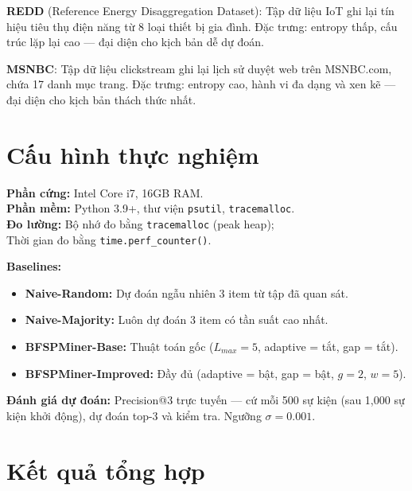 \documentclass[14pt,a4paper,oneside]{extreport}
\begin{document}
\textbf{REDD} (Reference Energy Disaggregation Dataset): Tập dữ liệu IoT ghi lại tín hiệu tiêu thụ điện năng từ 8 loại thiết bị gia đình. Đặc trưng: entropy thấp, cấu trúc lặp lại cao --- đại diện cho kịch bản dễ dự đoán.

\textbf{MSNBC}: Tập dữ liệu clickstream ghi lại lịch sử duyệt web trên MSNBC.com, chứa 17 danh mục trang. Đặc trưng: entropy cao, hành vi đa dạng và xen kẽ --- đại diện cho kịch bản thách thức nhất.

\section{Cấu hình thực nghiệm}

\textbf{Phần cứng:} Intel Core i7, 16GB RAM.\\
\textbf{Phần mềm:} Python 3.9+, thư viện \texttt{psutil}, \texttt{tracemalloc}.\\
\textbf{Đo lường:} Bộ nhớ đo bằng \texttt{tracemalloc} (peak heap);\\
Thời gian đo bằng \texttt{time.perf\_counter()}.

\textbf{Baselines:}
\begin{itemize}
    \item \textbf{Naive-Random:} Dự đoán ngẫu nhiên 3 item từ tập đã quan sát.
    \item \textbf{Naive-Majority:} Luôn dự đoán 3 item có tần suất cao nhất.
    \item \textbf{BFSPMiner-Base:} Thuật toán gốc ($L_{max} = 5$, adaptive = tắt, gap = tắt).
    \item \textbf{BFSPMiner-Improved:} Đầy đủ (adaptive = bật, gap = bật, $g = 2$, $w = 5$).
\end{itemize}

\textbf{Đánh giá dự đoán:} Precision@3 trực tuyến --- cứ mỗi 500 sự kiện (sau 1,000 sự kiện khởi động), dự đoán top-3 và kiểm tra. Ngưỡng $\sigma = 0.001$.

\section{Kết quả tổng hợp}
\end{document}
